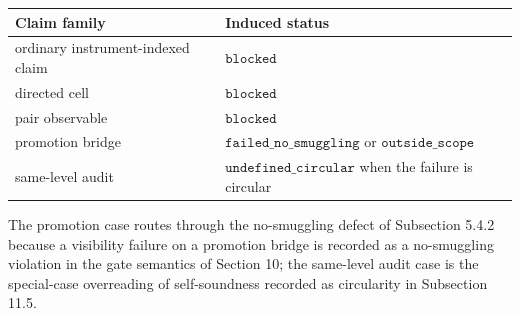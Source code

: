 \documentclass[11pt]{article}
\theoremstyle{definition}
\begin{document}
\begin{longtable}[]{@{}ll@{}}
\toprule
\begin{minipage}[b]{0.47\columnwidth}\raggedright
Claim family\strut
\end{minipage} & \begin{minipage}[b]{0.47\columnwidth}\raggedright
Induced status\strut
\end{minipage}\tabularnewline
\midrule
\endhead
\begin{minipage}[t]{0.47\columnwidth}\raggedright
ordinary instrument-indexed claim\strut
\end{minipage} & \begin{minipage}[t]{0.47\columnwidth}\raggedright
\(\texttt{blocked}\)\strut
\end{minipage}\tabularnewline
\begin{minipage}[t]{0.47\columnwidth}\raggedright
directed cell\strut
\end{minipage} & \begin{minipage}[t]{0.47\columnwidth}\raggedright
\(\texttt{blocked}\)\strut
\end{minipage}\tabularnewline
\begin{minipage}[t]{0.47\columnwidth}\raggedright
pair observable\strut
\end{minipage} & \begin{minipage}[t]{0.47\columnwidth}\raggedright
\(\texttt{blocked}\)\strut
\end{minipage}\tabularnewline
\begin{minipage}[t]{0.47\columnwidth}\raggedright
promotion bridge\strut
\end{minipage} & \begin{minipage}[t]{0.47\columnwidth}\raggedright
\(\texttt{failed\_no\_smuggling}\) or \(\texttt{outside\_scope}\)\strut
\end{minipage}\tabularnewline
\begin{minipage}[t]{0.47\columnwidth}\raggedright
same-level audit\strut
\end{minipage} & \begin{minipage}[t]{0.47\columnwidth}\raggedright
\(\texttt{undefined\_circular}\) when the failure is circular\strut
\end{minipage}\tabularnewline
\bottomrule
\end{longtable}

The promotion case routes through the no-smuggling defect of Subsection 5.4.2 because a visibility failure on a promotion bridge is recorded as a no-smuggling violation in the gate semantics of Section 10; the same-level audit case is the special-case overreading of self-soundness recorded as circularity in Subsection 11.5.
\end{document}

